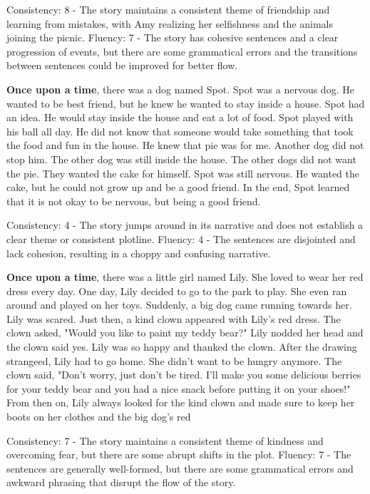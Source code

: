 \documentclass{article}
\begin{document}
Consistency: 8 - The story maintains a consistent theme of friendship and learning from mistakes, with Amy realizing her selfishness and the animals joining the picnic.
Fluency: 7 - The story has cohesive sentences and a clear progression of events, but there are some grammatical errors and the transitions between sentences could be improved for better flow.

\textbf{Once upon a time}, there was a dog named Spot. Spot was a nervous dog. He wanted to be best friend, but he knew he wanted to stay inside a house. Spot had an idea. He would stay inside the house and eat a lot of food. Spot played with his ball all day. He did not know that someone would take something that took the food and fun in the house. He knew that pie was for me. Another dog did not stop him. The other dog was still inside the house. The other dogs did not want the pie. They wanted the cake for himself. Spot was still nervous. He wanted the cake, but he could not grow up and be a good friend. In the end, Spot learned that it is not okay to be nervous, but being a good friend.

Consistency: 4 - The story jumps around in its narrative and does not establish a clear theme or consistent plotline.
Fluency: 4 - The sentences are disjointed and lack cohesion, resulting in a choppy and confusing narrative.

\textbf{Once upon a time}, there was a little girl named Lily. She loved to wear her red dress every day. One day, Lily decided to go to the park to play. She even ran around and played on her toys. Suddenly, a big dog came running towards her. Lily was scared. Just then, a kind clown appeared with Lily's red dress. The clown asked, "Would you like to paint my teddy bear?" Lily nodded her head and the clown said yes. Lily was so happy and thanked the clown. After the drawing strangeed, Lily had to go home. She didn't want to be hungry anymore. The clown said, "Don't worry, just don't be tired. I'll make you some delicious berries for your teddy bear and you had a nice snack before putting it on your shoes!" From then on, Lily always looked for the kind clown and made sure to keep her boots on her clothes and the big dog's red

Consistency: 7 - The story maintains a consistent theme of kindness and overcoming fear, but there are some abrupt shifts in the plot.
Fluency: 7 - The sentences are generally well-formed, but there are some grammatical errors and awkward phrasing that disrupt the flow of the story.
\end{document}
